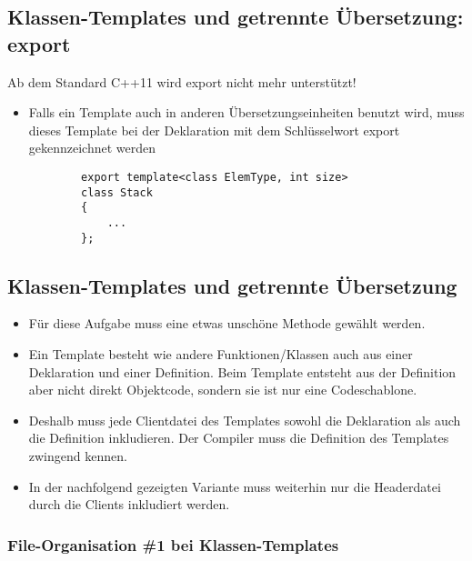 \subsection{Klassen-Templates und getrennte Übersetzung: export}
\label{sec:Klassen-Templates und getrennte Uebersetzung: export}
\begin{achtung}
	Ab dem Standard C++11 wird export nicht mehr unterstützt!
\end{achtung}
\begin{itemize}
	\item Falls ein Template auch in anderen Übersetzungseinheiten benutzt wird, muss dieses Template bei der Deklaration mit dem Schlüsselwort export gekennzeichnet werden
	\noindent
	\begin{minipage}{\linewidth}
		\begin{lstlisting}
		export template<class ElemType, int size>
		class Stack
		{
			...
		};
		\end{lstlisting}
	\end{minipage}
\end{itemize}

\subsection{Klassen-Templates und getrennte Übersetzung}
\label{sec:Klassen-Templates und getrennte Uebersetzung}
\begin{itemize}
	\item Für diese Aufgabe muss eine etwas unschöne Methode gewählt werden.
	\item Ein Template besteht wie andere Funktionen/Klassen auch aus einer Deklaration und einer Definition. Beim Template entsteht aus der Definition aber nicht direkt Objektcode, sondern sie ist nur eine Codeschablone.
	\item Deshalb muss jede Clientdatei des Templates sowohl die Deklaration als auch die Definition inkludieren. Der Compiler muss die Definition des Templates zwingend kennen.
	\item In der nachfolgend gezeigten Variante muss weiterhin nur die Headerdatei durch die Clients inkludiert werden.
\end{itemize}

\subsubsection{File-Organisation \#1 bei Klassen-Templates}
%
%
%


